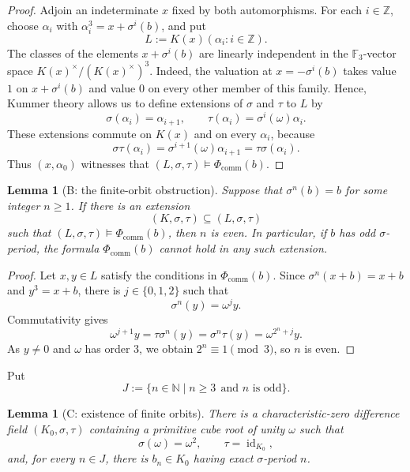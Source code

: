 \documentclass[11pt,a4paper]{amsart}
\renewcommand{\ge}{\geqslant}
\newtheorem{lemma}[theorem]{Lemma}
\theoremstyle{definition}
\newcommand{\Z}{\mathbb Z}
\newcommand{\N}{\mathbb N}
\DeclareMathOperator{\id}{id}
\begin{document}
\begin{proof}
Adjoin an indeterminate $x$ fixed by both automorphisms.
For each $i\in\Z$, choose $\alpha_i$ with
$\alpha_i^3=x+\sigma^i(b)$, and put
\[
L:=K(x)(\alpha_i:i\in\Z).
\]
The classes of the elements $x+\sigma^i(b)$ are linearly
independent in the $\mathbb F_3$-vector space
$K(x)^\times/(K(x)^\times)^3$. Indeed, the valuation at $x=-\sigma^i(b)$ takes value $1$
on $x+\sigma^i(b)$ and value $0$ on every other member
of this family. Hence, Kummer theory allows us to define extensions of $\sigma$ and $\tau$ to $L$ by
\[
  \sigma(\alpha_i)=\alpha_{i+1},
  \qquad
  \tau(\alpha_i)=\sigma^i(\omega)\alpha_i.
\]
These extensions commute on $K(x)$ and on every $\alpha_i$, because
\[
  \sigma\tau(\alpha_i)
  =\sigma^{i+1}(\omega)\alpha_{i+1}
  =\tau\sigma(\alpha_i).
\]
Thus $(x,\alpha_0)$ witnesses that $(L,\sigma,\tau)\models\Phi_{\mathrm{comm}}(b)$.
\end{proof}
\begin{lemma}[B: the finite-orbit obstruction]
\label{comm:lem:period}
Suppose that $\sigma^n(b)=b$ for some integer $n\ge1$.
If there is an extension
\[
  (K,\sigma,\tau)\subseteq(L,\sigma,\tau)
\]
such that $(L,\sigma,\tau)\models\Phi_{\mathrm{comm}}(b)$,
then $n$ is even. In particular, if $b$ has odd
$\sigma$-period, the formula $\Phi_{\mathrm{comm}}(b)$
cannot hold in any such extension.
\end{lemma}

\begin{proof}
Let $x,y\in L$ satisfy the conditions in
$\Phi_{\mathrm{comm}}(b)$. Since
$\sigma^n(x+b)=x+b$ and $y^3=x+b$, there is
$j\in\{0,1,2\}$ such that
\[
  \sigma^n(y)=\omega^j y.
\]
Commutativity gives
\[
  \omega^{j+1}y
  =\tau\sigma^n(y)
  =\sigma^n\tau(y)
  =\omega^{2^n+j}y.
\]
As $y\ne0$ and $\omega$ has order $3$, we obtain
$2^n\equiv1\pmod3$, so $n$ is even.
\end{proof}
Put
\[
J:=\{n\in\N\mid n\ge3\ \ \text{and $n$ is odd}\}.
\]

\begin{lemma}[C: existence of finite orbits]
\label{comm:lem:exist}
There is a characteristic-zero difference field
$(K_0,\sigma,\tau)$ containing a primitive cube
root of unity $\omega$ such that
\[
\sigma(\omega)=\omega^2,\qquad \tau=\id_{K_0},
\]
and, for every $n\in J$, there is $b_n\in K_0$ having exact
$\sigma$-period $n$.
\end{lemma}
\end{document}
